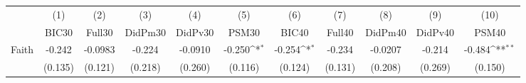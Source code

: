 {
\def\sym#1{\ifmmode^{#1}\else\(^{#1}\)\fi}
\begin{tabular}{l*{10}{c}}
\toprule
            &\multicolumn{1}{c}{(1)}&\multicolumn{1}{c}{(2)}&\multicolumn{1}{c}{(3)}&\multicolumn{1}{c}{(4)}&\multicolumn{1}{c}{(5)}&\multicolumn{1}{c}{(6)}&\multicolumn{1}{c}{(7)}&\multicolumn{1}{c}{(8)}&\multicolumn{1}{c}{(9)}&\multicolumn{1}{c}{(10)}\\
            &\multicolumn{1}{c}{BIC30}&\multicolumn{1}{c}{Full30}&\multicolumn{1}{c}{DidPm30}&\multicolumn{1}{c}{DidPv30}&\multicolumn{1}{c}{PSM30}&\multicolumn{1}{c}{BIC40}&\multicolumn{1}{c}{Full40}&\multicolumn{1}{c}{DidPm40}&\multicolumn{1}{c}{DidPv40}&\multicolumn{1}{c}{PSM40}\\
\midrule
Faith       &      -0.242         &     -0.0983         &      -0.224         &     -0.0910         &      -0.250\sym{*}  &      -0.254\sym{*}  &      -0.234         &     -0.0207         &      -0.214         &      -0.484\sym{**} \\
            &     (0.135)         &     (0.121)         &     (0.218)         &     (0.260)         &     (0.116)         &     (0.124)         &     (0.131)         &     (0.208)         &     (0.269)         &     (0.150)         \\
\bottomrule
\end{tabular}
}
